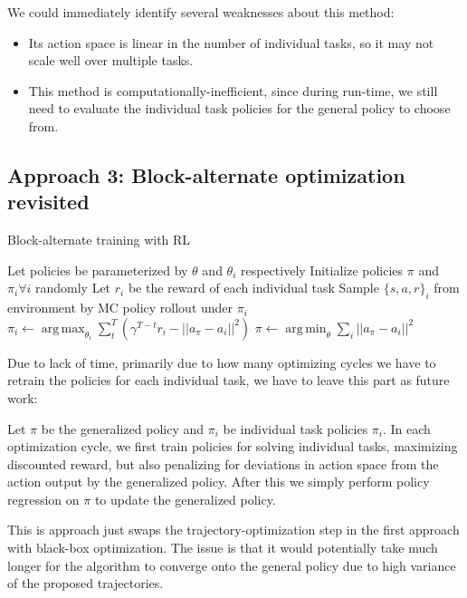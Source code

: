 \documentclass{article}
\DeclareMathOperator*{\argmin}{arg\,min}
\DeclareMathOperator*{\argmax}{arg\,max}
\begin{document}
We could immediately identify several weaknesses about this method:
\begin{itemize}
	\item Its action space is linear in the number of individual tasks, so it may not scale well over multiple tasks.
	\item This method is computationally-inefficient, since during run-time, we still need to evaluate the individual task policies for the general policy to choose from.
\end{itemize}

\subsection{Approach 3: Block-alternate optimization revisited}

\begin{algorithm}[tb]
	\caption{Block-alternate training with RL}
	\begin{algorithmic}
		\STATE Let policies be parameterized by $\theta$ and $\theta_i$ respectively
		\STATE Initialize policies $\pi$ and $\pi_i \forall i$ randomly
			\STATE Let $r_i$ be the reward of each individual task
				\STATE Sample $\{s,a,r\}_i$ from environment by MC policy rollout under $\pi_i$
				\STATE $\pi_i \leftarrow \argmax_{\theta_i} \sum_{t}^{T} (\gamma^{T-t}r_i - ||a_\pi - a_i||^2) $
			\ENDFOR
			\STATE $\pi \leftarrow \argmin_{\theta} \sum_{i} ||a_\pi - a_i||^2$
		\ENDFOR
	\end{algorithmic}
\end{algorithm}

Due to lack of time, primarily due to how many optimizing cycles we have to retrain the policies for each individual task, we have to leave this part as future work:

Let $\pi$ be the generalized policy and $\pi_i$ be individual task policies $\pi_i$. In each optimization cycle, we first train policies for solving individual tasks, maximizing discounted reward, but also penalizing for deviations in action space from the action output by the generalized policy. After this we simply perform policy regression on $\pi$ to update the generalized policy.

This is approach just swaps the trajectory-optimization step in the first approach with black-box optimization. The issue is that it would potentially take much longer for the algorithm to converge onto the general policy due to high variance of the proposed trajectories.
\end{document}

